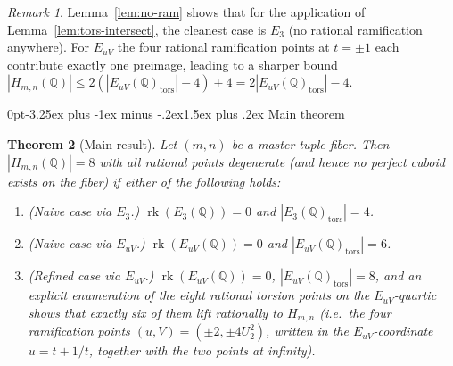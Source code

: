 \documentclass[12pt,a4paper,reqno]{amsart}
\makeatletter
\renewcommand{\subsection}{\@startsection{subsection}{2}%
  {0pt}{-3.25ex plus -1ex minus -.2ex}{1.5ex plus .2ex}%
  {\normalfont\normalsize\bfseries}}
\theoremstyle{plain}
\newtheorem{theorem}{Theorem}[section]
\theoremstyle{definition}
\theoremstyle{remark}
\newtheorem{remark}[theorem]{Remark}
\newcommand{\Q}{\mathbb{Q}}
\newcommand{\HC}{H_{m,n}}
\newcommand{\rk}{\operatorname{rk}}
\newcommand{\tors}{\mathrm{tors}}
\makeatother
\begin{document}
\begin{remark}
Lemma~\ref{lem:no-ram} shows that for the application of Lemma~\ref{lem:tors-intersect}, the cleanest case is $E_3$ (no rational ramification anywhere). For $E_{uV}$ the four rational ramification points at $t = \pm 1$ each contribute exactly one preimage, leading to a sharper bound $|\HC(\Q)| \le 2(|E_{uV}(\Q)_\tors| - 4) + 4 = 2|E_{uV}(\Q)_\tors| - 4$.
\end{remark}

\subsection{Main theorem}

\begin{theorem}[Main result]
\label{thm:hauptsatz}
Let $(m, n)$ be a master-tuple fiber. Then $|\HC(\Q)| = 8$ with all rational points degenerate (and hence no perfect cuboid exists on the fiber) if either of the following holds:
\begin{enumerate}[label=(\alph*),leftmargin=2em]
\item \emph{(Naive case via $E_3$.)} $\rk(E_3(\Q)) = 0$ and $|E_3(\Q)_\tors| = 4$.
\item \emph{(Naive case via $E_{uV}$.)} $\rk(E_{uV}(\Q)) = 0$ and $|E_{uV}(\Q)_\tors| = 6$.
\item \emph{(Refined case via $E_{uV}$.)} $\rk(E_{uV}(\Q)) = 0$, $|E_{uV}(\Q)_\tors| = 8$, and an explicit enumeration of the eight rational torsion points on the $E_{uV}$-quartic shows that exactly six of them lift rationally to $\HC$ (i.e.\ the four ramification points $(u, V) = (\pm 2, \pm 4 U_2^2)$, written in the $E_{uV}$-coordinate $u = t + 1/t$, together with the two points at infinity).
\end{enumerate}
\end{theorem}
\end{document}
